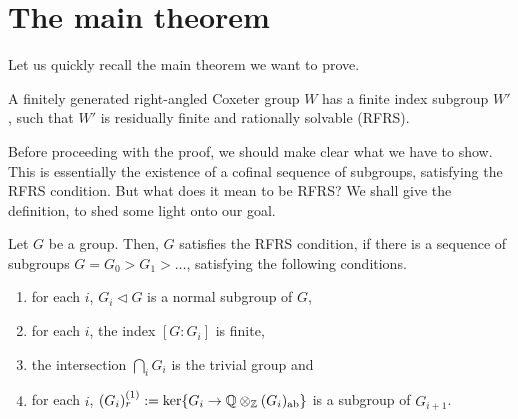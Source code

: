 \chapter{The main theorem}

Let us quickly recall the main theorem we want to prove.

\begin{theorem*}
    A finitely generated right-angled Coxeter group \(W\) has a finite index subgroup \(W'\), such that \(W'\) is residually finite and rationally solvable (RFRS).
\end{theorem*}

Before proceeding with the proof, we should make clear what we have to show.
This is essentially the existence of a cofinal sequence of subgroups, satisfying the RFRS condition.
But what does it mean to be RFRS?
We shall give the definition, to shed some light onto our goal.




\begin{definition}
    Let \(G\) be a group.
    Then, \(G\) satisfies the RFRS condition, if there is a sequence of subgroups \(G = G_0 > G_1 > \ldots\), satisfying the following conditions.
    \begin{enumerate}
        \item for each \(i\), \(G_i \triangleleft G\) is a normal subgroup of \(G\),
        \item for each \(i\), the index \([G : G_i]\) is finite,
        \item the intersection \(\bigcap_i G_i\) is the trivial group and
        \item for each \(i\), \((G_i)_r^{(1)} := \ker\{G_i \to \mathbb{Q} \otimes_{\mathbb{Z}} (G_i)_{\text{ab}}\}\) is a subgroup of \(G_{i+1}\).
    \end{enumerate}
\end{definition}

